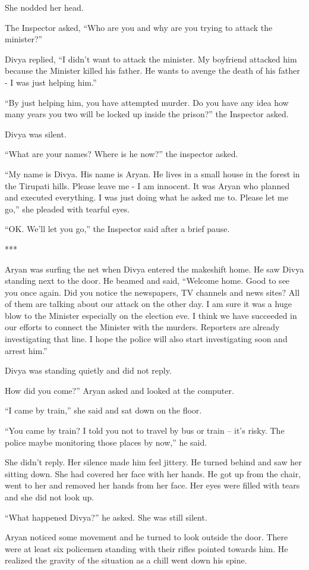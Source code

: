 She nodded her head.

The Inspector asked, “Who are you and why are you trying to attack the
minister?”

Divya replied, “I didn't want to attack the minister. My boyfriend attacked him
because the Minister killed his father. He wants to avenge the death of his
father - I was just helping him.”

“By just helping him, you have attempted murder. Do you have any idea how many
years you two will be locked up inside the prison?” the Inspector asked.

Divya was silent.

“What are your names? Where is he now?” the inspector asked.

“My name is Divya. His name is Aryan. He lives in a small house in the forest in
the Tirupati hills. Please leave me - I am innocent. It was Aryan who planned
and executed everything. I was just doing what he asked me to. Please let me
go,” she pleaded with tearful eyes.

“OK. We'll let you go,” the Inspector said after a brief pause.

***

Aryan was surfing the net when Divya entered the makeshift home. He saw Divya
standing next to the door. He beamed and said, “Welcome home. Good to see you
once again. Did you notice the newspapers, TV channels and news sites? All of
them are talking about our attack on the other day. I am sure it was a huge blow
to the Minister especially on the election eve. I think we have succeeded in our
efforts to connect the Minister with the murders. Reporters are already
investigating that line. I hope the police will also start investigating soon
and arrest him.”

Divya was standing quietly and did not reply.

How did you come?” Aryan asked and looked at the computer.

“I came by train,” she said and sat down on the floor.

“You came by train? I told you not to travel by bus or train – it's risky. The
police maybe monitoring those places by now,” he said.

She didn't reply. Her silence made him feel jittery. He turned behind and saw
her sitting down. She had covered her face with her hands. He got up from the
chair, went to her and removed her hands from her face. Her eyes were filled
with tears and she did not look up.

“What happened Divya?” he asked. She was still silent.

Aryan noticed some movement and he turned to look outside the door. There were
at least six policemen standing with their rifles pointed towards him. He
realized the gravity of the situation as a chill went down his spine.
